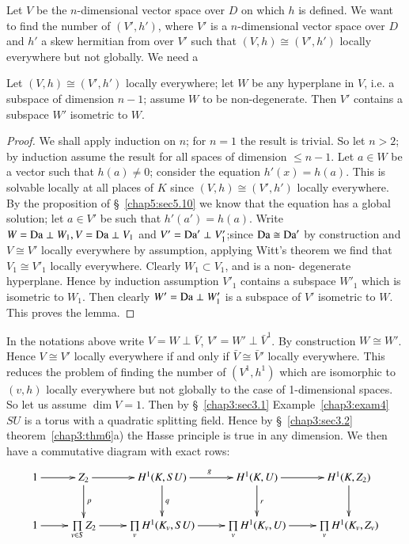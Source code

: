 Let $V$ be the $n$-dimensional vector space over $D$ on which $h$ is
defined. We want to find the number of $(V', h')$, where $V'$ is a
$n$-dimensio\-nal vector space over $D$ and $h'$ a skew hermitian from
over $V'$ such that $(V,h)\cong (V',h')$ locally everywhere but not
globally. We need a  

\begin{lemma*}
Let $(V,h)\cong (V',h')$ locally everywhere; let $W$ be any hyperplane
in $V$, i.e. a subspace of dimension $n-1$; assume $W$ to be
non-degenerate. Then $V'$ contains a subspace $W'$ isometric to $W$. 
\end{lemma*}

\begin{proof}
We shall apply induction on $n$; for $n=1$ the result is trivial. So
let $n>2$; by induction assume the result for all spaces of dimension
$\le n-1$. Let $a \in W$ be a vector such that $h(a)\neq 0$; consider
the equation $h' (x)=h(a)$. This is solvable locally at all places of
$K$ since $(V,h)\cong (V',h')$ locally everywhere. By the proposition
of \S~\ref{chap5:sec5.10} we know that the equation has a global
solution; let $a 
\in V'$ be such that $h'(a')=h(a)$. Write $W= \operatorname{Da} \perp W_1,V=\operatorname{Da}
\perp V_1$ and $V'=\operatorname{Da}' \perp V'_1$;\pageoriginale since $\operatorname{Da} \cong
\operatorname{Da}'$ by 
construction and $V \cong V'$ locally everywhere by assumption,
applying Witt's theorem we find that $V_1 \cong V'_1$ locally
everywhere. Clearly $W_1 \subset V_1$, and is a non- degenerate
hyperplane. Hence by induction assumption $V'_1$ contains a subspace
$W'_1$ which is isometric to $W_1$. Then clearly $W' =\operatorname{Da} \perp W'_1$
is a subspace of $V'$ isometric to $W$. This proves the lemma. 
\end{proof}

In the notations above write $V=W \perp \bar{V}$, $V' =W' \perp
\bar{V}^1$. By construction $W \cong W'$. Hence $V \cong V'$ locally
everywhere if and only if $\bar{V}\cong \bar{V}'$ locally
everywhere. This reduces the problem of finding the number of
$(V^1,h^1)$ which are isomorphic to $(v,h)$ locally everywhere but not
globally to the case of 1-dimensional spaces. So let us assume $\dim
V=1$. Then by \S~\ref{chap3:sec3.1} Example~\ref{chap3:exam4} $SU$
is a torus with a quadratic 
splitting field. Hence by \S~\ref{chap3:sec3.2} theorem~\ref{chap3:thm6}a) 
the Hasse principle is true in any dimension. We then have a 
commutative diagram with exact rows: 
{\fontsize{9}{11}\selectfont
\[
\xymatrix{
1 \ar[r] & Z_2 \ar[r] \ar[d]^p & H^1 (K, SU)  \ar[r]^g \ar[d]^q & H^1
(K,U) \ar[r] \ar[d]^r & H^1 (K, Z_2) \ar[d] \\
1 \ar[r] & \prod\limits_{v\in S} Z_2 \ar[r] & \prod\limits_v H^1 (K_v,
SU) \ar[r] & \prod\limits_v H^1 (K_v, U) \ar[r] & \prod\limits_v H^1
(K_v, Z_v)
}
\]}

